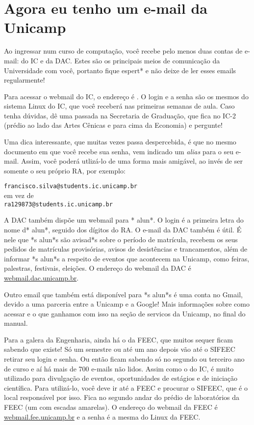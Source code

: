 
\section{Agora eu tenho um e-mail da Unicamp}

Ao ingressar num curso de computação, você recebe pelo menos duas contas de
e-mail: do IC e da DAC. Estes são os principais meios de comunicação da
Universidade com você, portanto fique espert* e não deixe de ler esses emails
regularmente!

Para acessar o webmail do IC, o endereço é
.  O login e a senha são os
mesmos do sistema Linux do IC, que você receberá nas primeiras semanas de
aula. Caso tenha dúvidas, dê uma passada na Secretaria de Graduação, que fica
no IC-2 (prédio ao lado das Artes Cênicas e para cima da Economia) e pergunte!

Uma dica interessante, que muitas vezes passa despercebida, é que no mesmo
documento em que você recebe sua senha, vem indicado um {\it alias} para o seu
e-mail. Assim, você poderá utlizá-lo de uma forma mais amigável, ao invés de
ser somente o seu próprio RA, por exemplo:

\begin{center}
\texttt{francisco.silva@students.ic.unicamp.br}\\
em vez de\\
\texttt{ra129873@students.ic.unicamp.br}
\end{center}

A DAC também dispõe um webmail para * alun*. O login é a primeira letra do nome
d* alun*, seguido dos dígitos do RA. O e-mail da DAC também é útil. É nele que
*s alun*s são avisad*s sobre o período de matrícula, recebem os seus pedidos de
matrículas provisórias, avisos de desistências e trancamentos, além de informar
*s alun*s a respeito de eventos que acontecem na Unicamp, como feiras,
palestras, festivais, eleições. O endereço do webmail da DAC é
\url{webmail.dac.unicamp.br}.

Outro email que também está disponível para *s alun*s é uma conta no Gmail,
devido a uma parceria entre a Unicamp e a Google! Mais informações sobre como
acessar e o que ganhamos com isso na seção de servicos da Unicamp, no final do
manual.

Para a galera da Engenharia, ainda há o da FEEC, que muitos sequer ficam
sabendo que existe! Só um semestre ou até um ano depois vão até o SIFEEC
retirar seu login e senha. Ou então ficam sabendo só no segundo ou terceiro ano
de curso e aí há mais de 700 e-mails não lidos. Assim como o do IC, é muito
utilizado para divulgação de eventos, oportunidades de estágios e de iniciação
científica. Para utilizá-lo, você deve ir até a FEEC e procurar o SIFEEC, que é
o local responsável por isso. Fica no segundo andar do prédio de laboratórios
da FEEC (um com escadas amarelas). O endereço do webmail da FEEC é
\url{webmail.fee.unicamp.br} e a senha é a mesma do Linux da FEEC.

